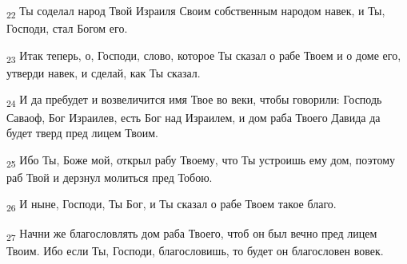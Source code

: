 \begin{tcolorbox}
\textsubscript{22} Ты соделал народ Твой Израиля Своим собственным народом навек, и Ты, Господи, стал Богом его.
\end{tcolorbox}
\begin{tcolorbox}
\textsubscript{23} Итак теперь, о, Господи, слово, которое Ты сказал о рабе Твоем и о доме его, утверди навек, и сделай, как Ты сказал.
\end{tcolorbox}
\begin{tcolorbox}
\textsubscript{24} И да пребудет и возвеличится имя Твое во веки, чтобы говорили: Господь Саваоф, Бог Израилев, есть Бог над Израилем, и дом раба Твоего Давида да будет тверд пред лицем Твоим.
\end{tcolorbox}
\begin{tcolorbox}
\textsubscript{25} Ибо Ты, Боже мой, открыл рабу Твоему, что Ты устроишь ему дом, поэтому раб Твой и дерзнул молиться пред Тобою.
\end{tcolorbox}
\begin{tcolorbox}
\textsubscript{26} И ныне, Господи, Ты Бог, и Ты сказал о рабе Твоем такое благо.
\end{tcolorbox}
\begin{tcolorbox}
\textsubscript{27} Начни же благословлять дом раба Твоего, чтоб он был вечно пред лицем Твоим. Ибо если Ты, Господи, благословишь, то будет он благословен вовек.
\end{tcolorbox}
